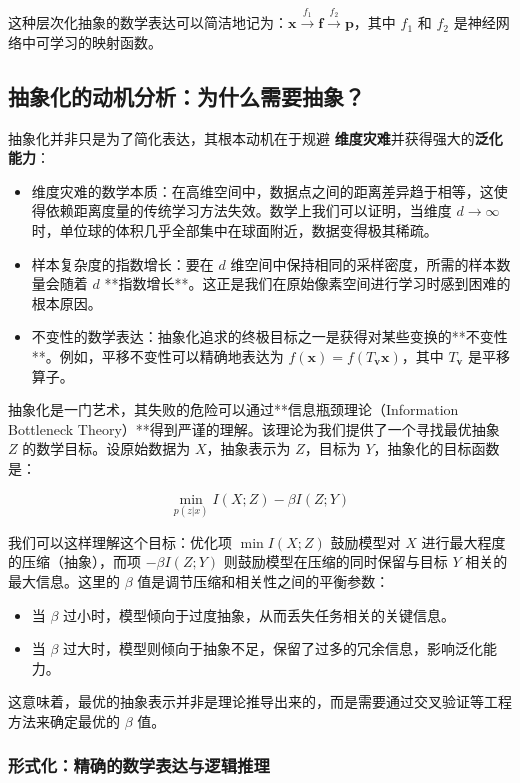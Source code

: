 这种层次化抽象的数学表达可以简洁地记为：$\mathbf{x} \xrightarrow{f_1} \mathbf{f} \xrightarrow{f_2} \mathbf{p}$，其中 $f_1$ 和 $f_2$ 是神经网络中可学习的映射函数。

\subsection*{抽象化的动机分析：为什么需要抽象？}

抽象化并非只是为了简化表达，其根本动机在于规避 \textbf{维度灾难}并获得强大的\textbf{泛化能力}：
\begin{itemize}
\item 维度灾难的数学本质：在高维空间中，数据点之间的距离差异趋于相等，这使得依赖距离度量的传统学习方法失效。数学上我们可以证明，当维度 $d \to \infty$ 时，单位球的体积几乎全部集中在球面附近，数据变得极其稀疏。
\item 样本复杂度的指数增长：要在 $d$ 维空间中保持相同的采样密度，所需的样本数量会随着 $d$ **指数增长**。这正是我们在原始像素空间进行学习时感到困难的根本原因。
\item 不变性的数学表达：抽象化追求的终极目标之一是获得对某些变换的**不变性**。例如，平移不变性可以精确地表达为 $f(\mathbf{x}) = f(T_{\mathbf{v}}\mathbf{x})$，其中 $T_{\mathbf{v}}$ 是平移算子。
\end{itemize}

抽象化是一门艺术，其失败的危险可以通过**信息瓶颈理论（Information Bottleneck Theory）**得到严谨的理解。该理论为我们提供了一个寻找最优抽象 $Z$ 的数学目标。设原始数据为 $X$，抽象表示为 $Z$，目标为 $Y$，抽象化的目标函数是：

$$\min_{p(z|x)} I(X;Z) - \beta I(Z;Y)$$

我们可以这样理解这个目标：优化项 $\min I(X;Z)$ 鼓励模型对 $X$ 进行最大程度的压缩（抽象），而项 $-\beta I(Z;Y)$ 则鼓励模型在压缩的同时保留与目标 $Y$ 相关的最大信息。这里的 $\beta$ 值是调节压缩和相关性之间的平衡参数：
\begin{itemize}
    \item 当 $\beta$ 过小时，模型倾向于过度抽象，从而丢失任务相关的关键信息。
    \item 当 $\beta$ 过大时，模型则倾向于抽象不足，保留了过多的冗余信息，影响泛化能力。
\end{itemize}
这意味着，最优的抽象表示并非是理论推导出来的，而是需要通过交叉验证等工程方法来确定最优的 $\beta$ 值。

\subsubsection{形式化：精确的数学表达与逻辑推理}

